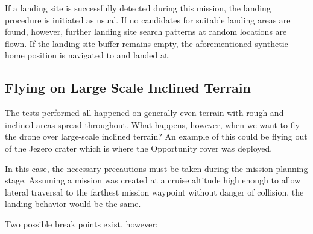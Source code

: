 If a landing site is successfully detected during this mission, the landing procedure is initiated as usual. If no candidates for suitable landing areas are found, however, further landing site search patterns at random locations are flown. If the landing site buffer remains empty, the aforementioned synthetic home position is navigated to and landed at.

\subsection{Flying on Large Scale Inclined Terrain}
The tests performed all happened on generally even terrain with rough and inclined areas spread throughout. What happens, however, when we want to fly the drone over large-scale inclined terrain? An example of this could be flying out of the Jezero crater which is where the Opportunity rover was deployed.

In this case, the necessary precautions must be taken during the mission planning stage. Assuming a mission was created at a cruise altitude high enough to allow lateral traversal to the farthest mission waypoint without danger of collision, the landing behavior would be the same. 

Two possible break points exist, however:


